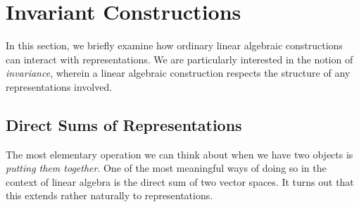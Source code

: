 \section{Invariant Constructions}

In this section, we briefly examine how ordinary linear algebraic constructions can interact with representations. We are particularly interested in the notion of \textit{invariance}, wherein a linear algebraic construction respects the structure of any representations involved.

\subsection{Direct Sums of Representations}

The most elementary operation we can think about when we have two objects is \textit{putting them together}. One of the most meaningful ways of doing so in the context of linear algebra is the direct sum of two vector spaces. It turns out that this extends rather naturally to representations.

